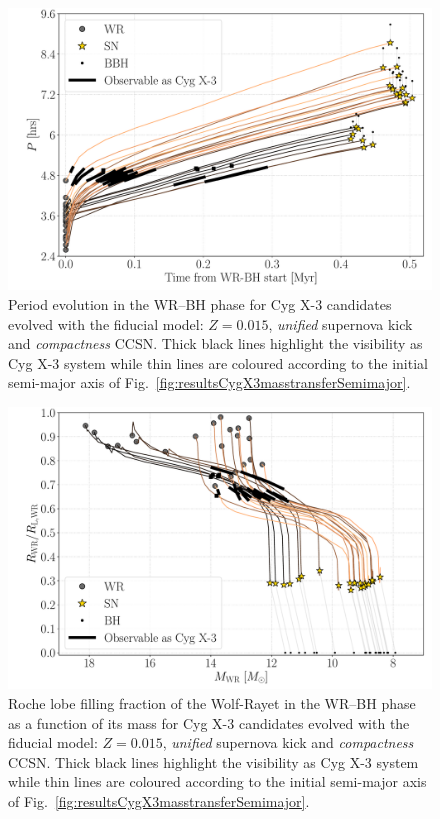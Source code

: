 \documentclass[a4paper,titlepage]{book}     	%
\begin{document}
\newpage
\begin{figure}[t!]
	\centering
	\includegraphics[width=\textwidth]{./images/BWorldtime_Period_BHBH_GW_WRBH_cyg_x-3--Ko17.pdf}
	\caption{Period evolution in the WR--BH phase for Cyg X-3 candidates evolved with the fiducial model: $Z=0.015$, \emph{unified} supernova kick and \emph{compactness} CCSN. Thick black lines highlight the visibility as Cyg X-3 system while thin lines are coloured according to the initial semi-major axis of Fig.\ \ref{fig:resultsCygX3masstransferSemimajor}.}\label{fig:resultsCygX3masstransferPeriod}
\end{figure}

\begin{figure}[b!]
		\centering
		\includegraphics[width=\textwidth]{./images/WR_Mass_1_RLfill1_BHBH_GW_WRBH_cyg_x-3--Ko17.pdf}	
    \caption{Roche lobe filling fraction of the Wolf-Rayet in the WR--BH phase as a function of its mass for Cyg X-3 candidates evolved with the fiducial model: $Z=0.015$, \emph{unified} supernova kick and \emph{compactness} CCSN. Thick black lines highlight the visibility as Cyg X-3 system while thin lines are coloured according to the initial semi-major axis of Fig.\ \ref{fig:resultsCygX3masstransferSemimajor}.}\label{fig:resultsCygX3masstransferwindfedduration}
\end{figure}
\end{document}

